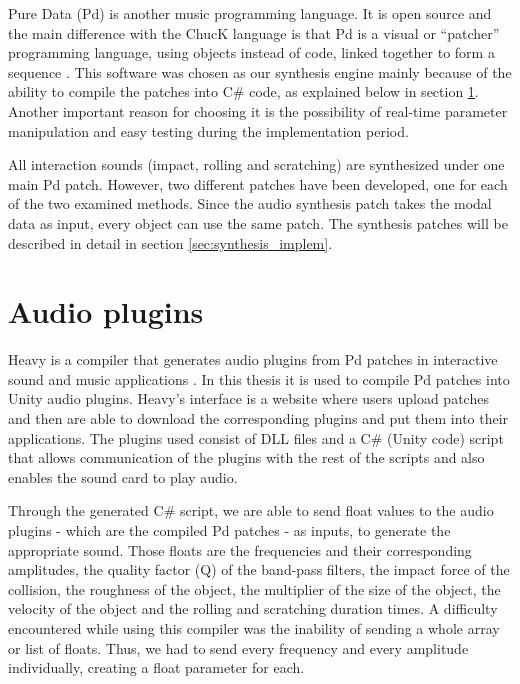 Pure Data (\gls{Pd}) is another music programming language. It is open source and the main difference with the ChucK language is that \gls{Pd} is a visual or ``patcher'' programming language, using objects instead of code, linked together to form a sequence \cite{bib:pd}. This software was chosen as our synthesis engine mainly because of the ability to compile the patches into C\# code, as explained below in section \ref{sec:heavy}. Another important reason for choosing it is the possibility of real-time parameter manipulation and easy testing during the implementation period.

All interaction sounds (impact, rolling and scratching) are synthesized under one main \gls{Pd} patch. However, two different patches have been developed, one for each of the two examined methods. Since the audio synthesis patch takes the modal data as input, every object can use the same patch. The synthesis patches will be described in detail in section \ref{sec:synthesis_implem}.


\section{Audio plugins}\label{sec:heavy}

Heavy is a compiler that generates audio plugins from \gls{Pd} patches in interactive sound and music applications \cite{bib:heavy}. In this thesis it is used to compile \gls{Pd} patches into Unity\textsuperscript{\textregistered} audio plugins. Heavy's interface is a website where users upload patches and then are able to download the corresponding plugins and put them into their applications. The plugins used consist of \gls{DLL} files and a C\# (Unity\textsuperscript{\textregistered} code) script that allows communication of the plugins with the rest of the scripts and also enables the sound card to play audio.

Through the generated C\# script, we are able to send float values to the audio plugins - which are the compiled \gls{Pd} patches - as inputs, to generate the appropriate sound. Those floats are the frequencies and their corresponding amplitudes, the quality factor (\gls{Q}) of the band-pass filters, the impact force of the collision, the roughness of the object, the multiplier of the size of the object, the velocity of the object and the rolling and scratching duration times. A difficulty encountered while using this compiler was the inability of sending a whole array or list of floats. Thus, we had to send every frequency and every amplitude individually, creating a float parameter for each.
 
